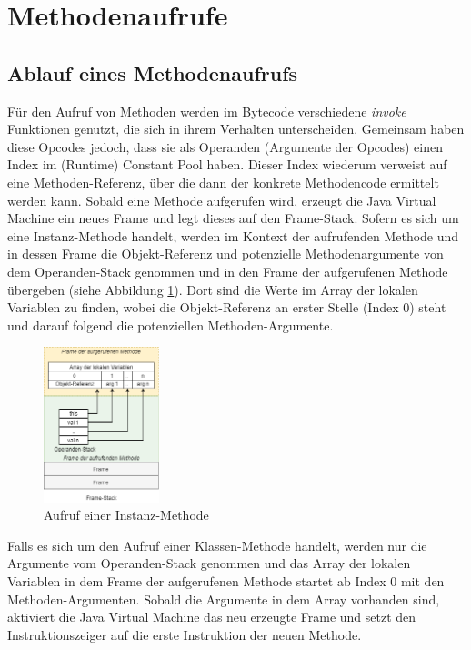 \documentclass[conference]{IEEEtran}
\begin{document}
\section{Methodenaufrufe}
\subsection{Ablauf eines Methodenaufrufs}
Für den Aufruf von Methoden werden im Bytecode verschiedene \textit{invoke} Funktionen genutzt, die sich in ihrem Verhalten unterscheiden. Gemeinsam haben diese Opcodes jedoch, dass sie als Operanden (Argumente der Opcodes) einen Index  im (Runtime) Constant Pool haben. Dieser Index wiederum verweist auf eine Methoden-Referenz, über die dann der konkrete Methodencode ermittelt werden kann. Sobald eine Methode aufgerufen wird, erzeugt die Java Virtual Machine ein neues Frame und legt dieses auf den Frame-Stack. Sofern es sich um eine Instanz-Methode handelt, werden im Kontext der aufrufenden Methode und in dessen Frame die Objekt-Referenz und potenzielle Methodenargumente von dem Operanden-Stack genommen und in den Frame der aufgerufenen Methode übergeben (siehe Abbildung \ref{fig:aufrufMethode}). Dort sind die Werte im Array der lokalen Variablen zu finden, wobei die Objekt-Referenz an erster Stelle (Index 0) steht und darauf folgend die potenziellen Methoden-Argumente. 

\begin{figure}[htbp] 
  \centering
     \includegraphics[width=0.3\textwidth]{Grafiken/MethodenAufrufJVM.png}
  \caption{Aufruf einer Instanz-Methode}
  \label{fig:aufrufMethode}
\end{figure}

Falls es sich um den Aufruf einer Klassen-Methode handelt, werden nur die Argumente vom Operanden-Stack genommen und das Array der lokalen Variablen in dem Frame der aufgerufenen Methode startet ab Index 0 mit den Methoden-Argumenten. Sobald die Argumente in dem Array vorhanden sind, aktiviert die Java Virtual Machine das neu erzeugte Frame und setzt den Instruktionszeiger auf die erste Instruktion der neuen Methode.\cite{Venners.1997}
\end{document}
